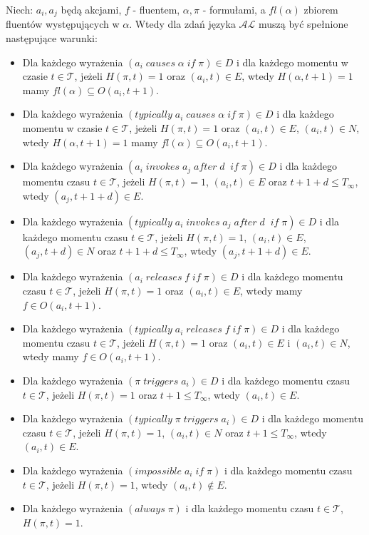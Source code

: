 Niech: $a_i,a_j$ będą akcjami, $ f $ - fluentem, $\alpha, \pi$ - formułami, a $fl(\alpha)$ zbiorem fluentów
występujących w $\alpha$. Wtedy dla zdań języka $\mathcal{AL}$  muszą być spełnione następujące warunki:
   \begin{itemize}
   		\item Dla każdego wyrażenia $ ( a_i\;causes\;\alpha\;if\;\pi)\in D $ i dla każdego momentu w czasie
   		$t \in \mathcal{T}$, jeżeli $H(\pi,t)=1$ oraz $(a_i,t) \in E$, wtedy $H(\alpha,t + 1)=1$ mamy $fl(\alpha)\subseteq O(a_i,t + 1)$.
		\item Dla każdego wyrażenia $ ( typically\; a_i\;causes\;\alpha\;if\;\pi)\in D $ i dla każdego momentu w czasie
		 $t \in \mathcal{T}$, jeżeli $H(\pi,t)=1$ oraz $(a_i,t) \in E$, $(a_i,t) \in N$, wtedy $H(\alpha,t + 1)=1$ mamy $fl(\alpha)\subseteq O(a_i,t + 1)$.
 		\item Dla każdego wyrażenia $( a_i\;invokes\;a_j\;after\;d\;\;if\;\pi)\in D$ i dla każdego momentu czasu
 		$t \in \mathcal{T}$, jeżeli $H(\pi,t)=1$, $(a_i,t)\in E $ oraz $t+1+d\leq T_{\infty}$, wtedy $(a_j,t+1+d) \in E $.
	 	\item Dla każdego wyrażenia $( typically\; a_i\;invokes\;a_j\;after\;d\;\;if\;\pi)\in D$ i dla każdego momentu czasu
	 	$t \in \mathcal{T}$, jeżeli $H(\pi,t)=1$, $(a_i,t)\in E$, $(a_j, t + d)\in N $ oraz $t+1+d\leq T_{\infty}$, wtedy $(a_j,t+1+d) \in E $.
   		\item Dla każdego wyrażenia $( a_i\;releases\;f\;if\;\pi)\in D $ i dla każdego momentu czasu
   		$t \in \mathcal{T}$, jeżeli $H(\pi,t)=1$ oraz $(a_i,t)\in E$, wtedy mamy $f\in O(a_i,t+1)$.
 		\item Dla każdego wyrażenia $( typically\; a_i \;releases\;f\;if\;\pi)\in D $ i dla każdego momentu czasu
 		$t \in \mathcal{T}$, jeżeli $H(\pi,t)=1$ oraz $(a_i,t)\in E$ i $(a_i,t)\in N$, wtedy mamy $f\in O(a_i,t+1)$.
   		\item Dla każdego wyrażenia $(\pi\;triggers\; a_i)\in D$ i dla każdego momentu czasu $t \in \mathcal{T}$,
   		jeżeli $H(\pi,t)=1$ oraz $t+1\leq T_{\infty}$, wtedy $(a_i,t)\in E$.
		\item Dla każdego wyrażenia $(typically\; \pi\;triggers\; a_i)\in D$ i dla każdego momentu czasu
		$t \in \mathcal{T}$, jeżeli $H(\pi,t)=1$, $(a_i, t)\in N$ oraz $t+1\leq T_{\infty}$, wtedy $(a_i,t)\in E$.
		\item Dla każdego wyrażenia $(impossible \; a_i \; if\;  \pi )$ i dla każdego momentu czasu $t \in \mathcal{T}$,
		jeżeli $H(\pi,t)=1$, wtedy $(a_i,t) \notin E $.
		\item Dla każdego wyrażenia $(always \; \pi )$ i dla każdego momentu czasu $t \in \mathcal{T}$, $H(\pi,t)=1$.
   \end{itemize}
